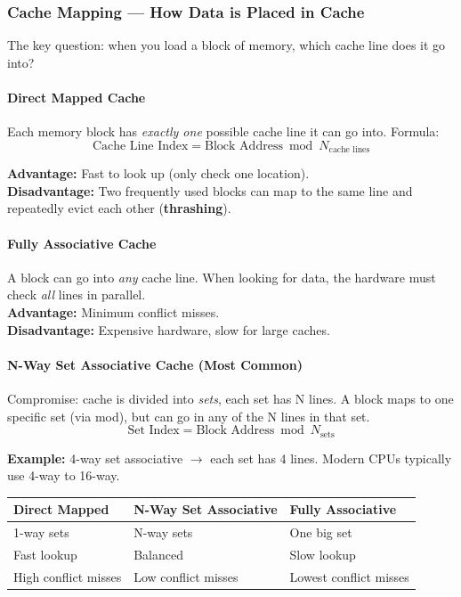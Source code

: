 \documentclass[11pt,a4paper]{article}
\newcommand{\term}[1]{\textbf{\color{darkblue}#1}}
\begin{document}
\subsubsection{Cache Mapping --- How Data is Placed in Cache}

The key question: when you load a block of memory, which cache line does it go into?

\paragraph{Direct Mapped Cache}

Each memory block has \textit{exactly one} possible cache line it can go into. Formula:
\[
\text{Cache Line Index} = \text{Block Address} \bmod N_{\text{cache lines}}
\]

\textbf{Advantage:} Fast to look up (only check one location).\\
\textbf{Disadvantage:} Two frequently used blocks can map to the same line and repeatedly evict each other (\term{thrashing}).

\paragraph{Fully Associative Cache}

A block can go into \textit{any} cache line. When looking for data, the hardware must check \textit{all} lines in parallel.\\
\textbf{Advantage:} Minimum conflict misses.\\
\textbf{Disadvantage:} Expensive hardware, slow for large caches.

\paragraph{N-Way Set Associative Cache (Most Common)}

Compromise: cache is divided into \textit{sets}, each set has N lines. A block maps to one specific set (via mod), but can go in any of the N lines in that set.
\[
\text{Set Index} = \text{Block Address} \bmod N_{\text{sets}}
\]

\textbf{Example:} 4-way set associative $\to$ each set has 4 lines. Modern CPUs typically use 4-way to 16-way.

\begin{center}
\begin{tabular}{C{3.5cm} C{3.5cm} C{3.5cm}}
\toprule
Direct Mapped & N-Way Set Associative & Fully Associative \\
-way sets & N-way sets & One big set \\
Fast lookup & Balanced & Slow lookup \\
High conflict misses & Low conflict misses & Lowest conflict misses \\
\bottomrule
\end{tabular}
\end{center}
\end{document}
